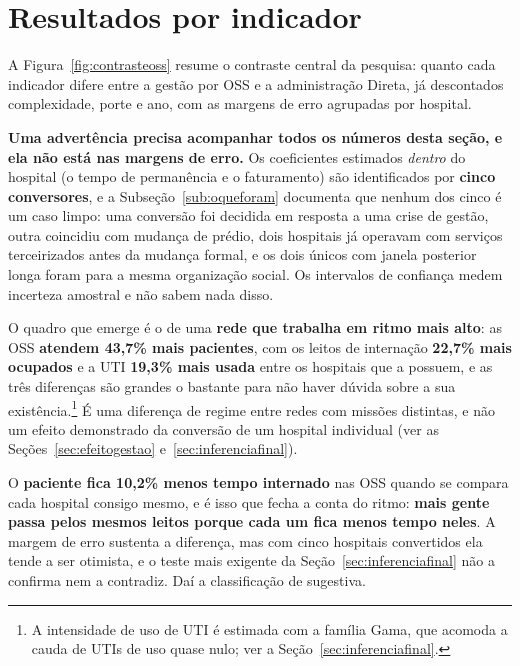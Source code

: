 \section{Resultados por indicador}
\label{sec:resultados}

A Figura~\ref{fig:contrasteoss} resume o contraste central da pesquisa:
quanto cada indicador difere entre a gestão por OSS e a administração
Direta, já descontados complexidade, porte e ano, com as margens de
erro agrupadas por hospital.

\textbf{Uma advertência precisa acompanhar todos os números desta seção,
e ela não está nas margens de erro.} Os coeficientes estimados \emph{dentro}
do hospital (o tempo de permanência e o faturamento) são identificados por
\textbf{cinco conversores}, e a Subseção~\ref{sub:oqueforam} documenta que
nenhum dos cinco é um caso limpo: uma conversão foi decidida em resposta a
uma crise de gestão, outra coincidiu com mudança de prédio, dois hospitais
já operavam com serviços terceirizados antes da mudança formal, e os dois
únicos com janela posterior longa foram para a mesma organização social.
Os intervalos de confiança medem incerteza amostral e não sabem nada
disso.

O quadro que emerge é o de uma \textbf{rede que trabalha em ritmo mais
alto}: as OSS \textbf{atendem 43,7\% mais pacientes}, com os leitos de
internação \textbf{22,7\% mais ocupados} e a UTI \textbf{19,3\% mais
usada} entre os hospitais que a possuem, e as três diferenças são grandes
o bastante para não haver dúvida sobre a sua existência.\footnote{A
intensidade de uso de UTI é estimada com a família Gama, que acomoda a
cauda de UTIs de uso quase nulo; ver a Seção~\ref{sec:inferenciafinal}.}
É uma diferença de regime entre redes com missões distintas, e não um
efeito demonstrado da conversão de um hospital individual (ver as
Seções~\ref{sec:efeitogestao} e~\ref{sec:inferenciafinal}).

O \textbf{paciente fica 10,2\% menos tempo internado} nas OSS quando se
compara cada hospital consigo mesmo, e é isso que fecha a conta do ritmo:
\textbf{mais gente passa pelos mesmos leitos porque cada um fica menos
tempo neles}. A margem de erro sustenta a diferença, mas com cinco
hospitais convertidos ela tende a ser otimista, e o teste mais exigente da
Seção~\ref{sec:inferenciafinal} não a confirma nem a contradiz. Daí a
classificação de sugestiva.


